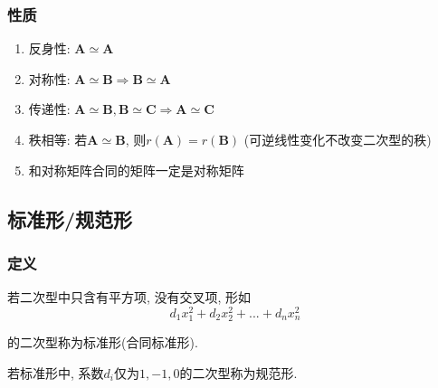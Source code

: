 \subsubsection{性质}
\begin{enumerate}
\item 反身性: $ \bm{A}\simeq \bm{A} $
\item 对称性: $ \bm{A}\simeq \bm{B}\Rightarrow \bm{B}\simeq \bm{A} $
\item 传递性: $ \bm{A}\simeq \bm{B}, \bm{B}\simeq \bm{C}\Rightarrow \bm{A}\simeq \bm{C} $
\item 秩相等: 若$\bm{A}\simeq \bm{B}$, 则$r(\bm{A})=r(\bm{B})$ (可逆线性变化不改变二次型的秩)
\item 和对称矩阵合同的矩阵一定是对称矩阵
\end{enumerate}
\subsection{标准形/规范形}
\subsubsection{定义}
若二次型中只含有平方项, 没有交叉项, 形如
\begin{equation*}
d_{1}x_{1}^{2}+d_{2}x_{2}^{2}+... +d_{n}x_{n}^{2}
\end{equation*}\par
的二次型称为标准形(合同标准形).\par
若标准形中, 系数$ d_{i} $仅为$ 1, -1, 0 $的二次型称为规范形.
